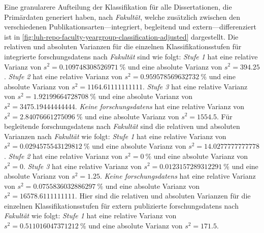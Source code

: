 Eine granularere Aufteilung der Klassifikation für alle Dissertationen, die Primärdaten generiert haben, nach \textit{Fakultät}, welche zusätzlich zwischen den verschiedenen Publikationsarten---integriert, begleitend und extern---differenziert ist in \cref{fig:luh-repo-faculty-yeargroup-classification-adjusted} dargestellt.
%
Die relativen und absoluten Varianzen für die einzelnen Klassifikationsstufen für integrierte \glspl{forschungsdaten} nach \textit{Fakultät} sind wie folgt:
\textit{Stufe 1} hat eine relative Varianz von $s^2=\SI[round-mode=places,round-precision=3]{0.109748308526971}{\percent}$ und eine absolute Varianz von $s^2=\num[round-mode=places,round-precision=3]{394.25}$.
\textit{Stufe 2} hat eine relative Varianz von $s^2=\SI[round-mode=places,round-precision=3]{0.959578569632732}{\percent}$ und eine absolute Varianz von $s^2=\num[round-mode=places,round-precision=3]{1164.61111111111}$.
\textit{Stufe 3} hat eine relative Varianz von $s^2=\SI[round-mode=places,round-precision=3]{1.92199664728708}{\percent}$ und eine absolute Varianz von $s^2=\num[round-mode=places,round-precision=3]{3475.19444444444}$.
\textit{Keine \glspl{forschungsdaten}} hat eine relative Varianz von $s^2=\SI[round-mode=places,round-precision=3]{2.84076661275096}{\percent}$ und eine absolute Varianz von $s^2=\num[round-mode=places,round-precision=3]{1554.5}$.
%
Für begleitende \glspl{forschungsdaten} nach \textit{Fakultät} sind die relativen und absoluten Varianzen nach \textit{Fakultät} wie folgt:
\textit{Stufe 1} hat eine relative Varianz von $s^2=\SI[round-mode=places,round-precision=3]{0.0294575543129812}{\percent}$ und eine absolute Varianz von $s^2=\num[round-mode=places,round-precision=3]{14.0277777777778}$.
\textit{Stufe 2} hat eine relative Varianz von $s^2=\SI[round-mode=places,round-precision=3]{0}{\percent}$ und eine absolute Varianz von $s^2=\num[round-mode=places,round-precision=3]{0}$.
\textit{Stufe 3} hat eine relative Varianz von $s^2=\SI[round-mode=places,round-precision=3]{0.0123157289312291}{\percent}$ und eine absolute Varianz von $s^2=\num[round-mode=places,round-precision=3]{1.25}$.
\textit{Keine \glspl{forschungsdaten}} hat eine relative Varianz von $s^2=\SI[round-mode=places,round-precision=3]{0.0755836032886297}{\percent}$ und eine absolute Varianz von $s^2=\num[round-mode=places,round-precision=3]{16578.6111111111}$.
%
Hier sind die relativen und absoluten Varianzen für die einzelnen Klassifikationsstufen für extern publizierte \glspl{forschungsdaten} nach \textit{Fakultät} wie folgt:
\textit{Stufe 1} hat eine relative Varianz von $s^2=\SI[round-mode=places,round-precision=3]{0.511016047371212}{\percent}$ und eine absolute Varianz von $s^2=\num[round-mode=places,round-precision=3]{171.5}$.
